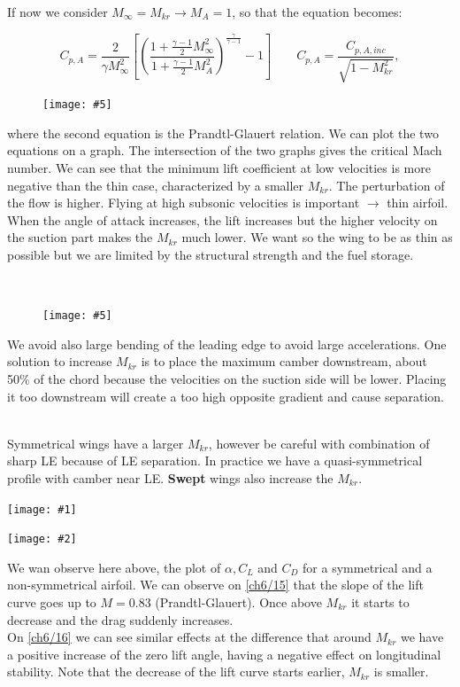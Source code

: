 \documentclass[british,french,11pt, a4paper, openany]{article}
\newcommand{\wrapfig}[6]{%
	\begin{figure}%
		\vspace{-5mm}%
		\texttt{[image: \#5]}%
		\captionof{figure}{}%
		\label{#6}%
	\end{figure}%
}
\newcommand{\minifig}[6]{
	\begin{center}%
		\begin{minipage}{#5\textwidth}%
			\texttt{[image: \#1]}%
			\captionof{figure}{}%
			\label{#1}%
		\end{minipage}%
		\begin{minipage}{#6\textwidth}%
			\texttt{[image: \#2]}%
			\captionof{figure}{}%
			\label{#2}%
		\end{minipage}%
	\end{center}
}
\begin{document}
If now we consider $M_\infty = M_{kr} \rightarrow M_A = 1$, so that the equation becomes: 

\begin{equation}
C_{p,A} = \frac{2}{\gamma M_\infty^2} \left[ \left(\frac{1+\frac{\gamma - 1}{2}M^2_\infty}{1+\frac{\gamma - 1}{2}M^2_A}\right)^{\frac{\gamma}{\gamma -1}} -1 \right] \qquad C_{p,A} = \frac{C_{p,A,inc}}{\sqrt{1-M_{kr}^2}},
\end{equation}


\wrapfig{10}{r}{5}{0.15}{ch6/13}{fig:6.13}
where the second equation is the Prandtl-Glauert relation. 
We can plot the two equations on a graph. The intersection of the two graphs gives the critical Mach number. We can see that the minimum lift coefficient at low velocities is more negative than the thin case, characterized by a smaller $M_{kr}$. The perturbation of the flow is higher. Flying at high subsonic velocities is important $\rightarrow$ thin airfoil. When the angle of attack increases, the lift increases but the higher velocity on the suction part makes the $M_{kr}$ much lower. We want so the wing to be as thin as possible but we are limited by the structural strength and the fuel storage.

\ \\
\wrapfig{10}{l}{4.5}{0.1}{ch6/14}{fig:6.14}
We avoid also large bending of the leading edge to avoid large accelerations. One solution to increase $M_{kr}$ is to place the maximum camber downstream, about 50\% of the chord because the velocities on the suction side will be lower. Placing it too downstream will create a too high opposite gradient and cause separation. 

\ \\ Symmetrical wings have a larger $M_{kr}$, however be careful with combination of sharp LE because of LE separation. In practice we have a quasi-symmetrical profile with camber near LE. \textbf{Swept} wings also increase the $M_{kr}$. 

\minifig{ch6/15}{ch6/16}{0.2}{0.15}{0.45}{0.3}

We wan observe here above, the plot of $\alpha, C_L$ and $C_D$ for a symmetrical and a non-symmetrical airfoil. We can observe on \autoref{ch6/15} that the slope of the lift curve goes up to $M=0.83$ (Prandtl-Glauert). Once above $M_{kr}$ it starts to decrease and the drag suddenly increases. \\

On \autoref{ch6/16} we can see similar effects at the difference that around $M_{kr}$ we have a positive increase of the zero lift angle, having a negative effect on longitudinal stability. Note that the decrease of the lift curve starts earlier, $M_{kr}$ is smaller. 
\end{document}

